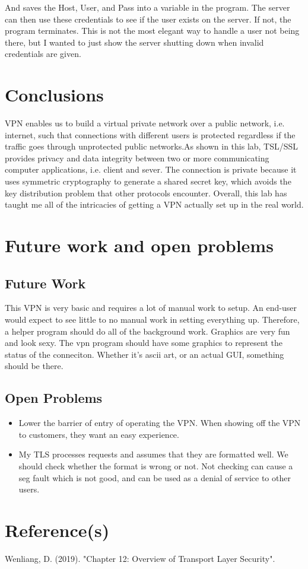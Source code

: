 \documentclass[12pt]{article}
\begin{document}
And saves the Host, User, and Pass into a variable in the program. The server can then use these credentials to see if the user exists on the server. If not, the program terminates. This is not the most elegant way to handle a user not being there, but I wanted to just show the server shutting down when invalid credentials are given.


\section{Conclusions}
VPN enables us to build a virtual private network over a public network, i.e. internet, such that connections with different users is protected regardless if the traffic goes through unprotected public networks.As shown in this lab, TSL/SSL provides privacy and data integrity between two or more communicating computer applications, i.e. client and sever. The connection is private because it uses symmetric cryptography to generate a shared secret key, which avoids the key distribution problem that other protocols encounter. Overall, this lab has taught me all of the intricacies of getting a VPN actually set up in the real world.

\section{Future work and open problems}
\subsection{Future Work}
This VPN is very basic and requires a lot of manual work to setup. An end-user would expect to see little to no manual work in setting everything up. Therefore, a helper program should do all of the background work. Graphics are very fun and look sexy. The vpn program should have some graphics to represent the status of the conneciton. Whether it's ascii art, or an actual GUI, something should be there.
\subsection{Open Problems}
\begin{itemize}
    \item Lower the barrier of entry of operating the VPN. When showing off the VPN to customers, they want an easy experience.
    \item My TLS processes requests and assumes that they are formatted well. We should check whether the format is wrong or not. Not checking can cause a seg fault which is not good, and can be used as a denial of service to other users.
\end{itemize}

\section{Reference(s)}
\item Wenliang, D. (2019). "Chapter 12: Overview of Transport Layer Security".
 
\end{document}
